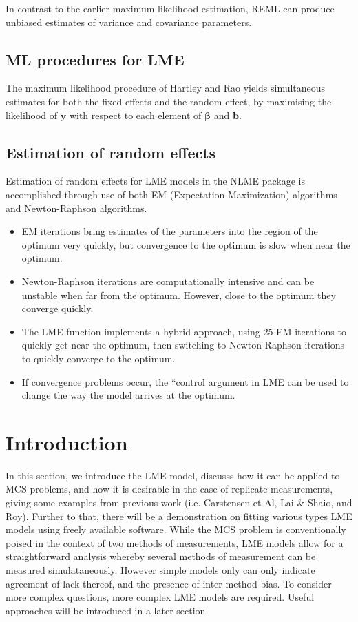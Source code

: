 \documentclass[12pt, a4paper]{report}
\theoremstyle{plain}
\theoremstyle{definition}
\theoremstyle{remark}
\begin{document}
	In contrast to the earlier maximum likelihood estimation, REML can produce unbiased estimates of variance and covariance parameters.
	
	\subsection{ML procedures for LME}
	
	The maximum likelihood procedure of Hartley and Rao yields
	simultaneous estimates for both the fixed effects and the random
	effect, by maximising the likelihood of $\boldsymbol{y}$ with
	respect to each element of $\boldsymbol{\beta}$ and
	$\boldsymbol{b}$.
	
	\subsection{Estimation of random effects}
	
	Estimation of random effects for LME models in the NLME package is accomplished through use
	of both EM (Expectation-Maximization) algorithms and Newton-Raphson algorithms.
	\begin{itemize}
		\item EM iterations bring estimates of the parameters into the region of the optimum very quickly, but
		convergence to the optimum is slow when near the optimum.
		\item Newton-Raphson iterations are computationally intensive and can be unstable when far from the
		optimum. However, close to the optimum they converge quickly.
		\item The LME function implements a hybrid approach, using 25 EM iterations to quickly get near the
		optimum, then switching to Newton-Raphson iterations to quickly converge to the optimum. \item If
		convergence problems occur, the ``control argument in LME can be used to change the way the
		model arrives at the optimum.
	\end{itemize}
	
	
	\section{Introduction}
	In this section, we introduce the LME model, discusss how it can be applied to MCS problems, and how it is desirable in the case of replicate measurements, giving some examples from previous work (i.e. Carstensen et Al, Lai \& Shaio, and Roy). Further to that, there will be a demonstration on fitting various types LME models using freely available software.
	While the MCS problem is conventionally poised in the context of two methods of measurements, LME models allow for a straightforward analysis whereby several methods of measurement can be measured simulataneously. However simple models only can only indicate agreement of lack thereof, and the presence of inter-method bias. To consider more complex questions, more complex LME models are required.  Useful approaches will be introduced in a later section.
	
\end{document}
